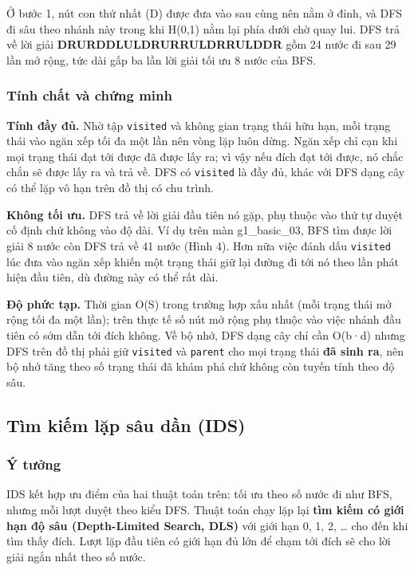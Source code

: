 Ở bước 1, nút con thứ nhất (D) được đưa vào sau cùng nên nằm ở đỉnh, và DFS đi sâu theo nhánh này trong khi H(0,1) nằm lại phía dưới chờ quay lui. DFS trả về lời giải \textbf{DRURDDLULDRURRULDRRULDDR} gồm 24 nước đi sau 29 lần mở rộng, tức dài gấp ba lần lời giải tối ưu 8 nước của BFS.

\subsubsection{Tính chất và chứng minh}

\textbf{Tính đầy đủ.} Nhờ tập \texttt{visited} và không gian trạng thái hữu hạn, mỗi trạng thái vào ngăn xếp tối đa một lần nên vòng lặp luôn dừng. Ngăn xếp chỉ cạn khi mọi trạng thái đạt tới được đã được lấy ra; vì vậy nếu đích đạt tới được, nó chắc chắn sẽ được lấy ra và trả về. DFS có \texttt{visited} là đầy đủ, khác với DFS dạng cây có thể lặp vô hạn trên đồ thị có chu trình.

\textbf{Không tối ưu.} DFS trả về lời giải đầu tiên nó gặp, phụ thuộc vào thứ tự duyệt cố định chứ không vào độ dài. Ví dụ trên màn g1\_basic\_03, BFS tìm được lời giải 8 nước còn DFS trả về 41 nước (Hình 4). Hơn nữa việc đánh dấu \texttt{visited} lúc đưa vào ngăn xếp khiến một trạng thái giữ lại đường đi tới nó theo lần phát hiện đầu tiên, dù đường này có thể rất dài.

\textbf{Độ phức tạp.} Thời gian O(\textbar{}S\textbar{}) trong trường hợp xấu nhất (mỗi trạng thái mở rộng tối đa một lần); trên thực tế số nút mở rộng phụ thuộc vào việc nhánh đầu tiên có sớm dẫn tới đích không. Về bộ nhớ, DFS dạng cây chỉ cần O(b·d) nhưng DFS trên đồ thị phải giữ \texttt{visited} và \texttt{parent} cho mọi trạng thái \textbf{đã sinh ra}, nên bộ nhớ tăng theo số trạng thái đã khám phá chứ không còn tuyến tính theo độ sâu.

\subsection{Tìm kiếm lặp sâu dần (IDS)}

\subsubsection{Ý tưởng}

IDS kết hợp ưu điểm của hai thuật toán trên: tối ưu theo số nước đi như BFS, nhưng mỗi lượt duyệt theo kiểu DFS. Thuật toán chạy lặp lại \textbf{tìm kiếm có giới hạn độ sâu (Depth-Limited Search, DLS)} với giới hạn 0, 1, 2, … cho đến khi tìm thấy đích. Lượt lặp đầu tiên có giới hạn đủ lớn để chạm tới đích sẽ cho lời giải ngắn nhất theo số nước.

